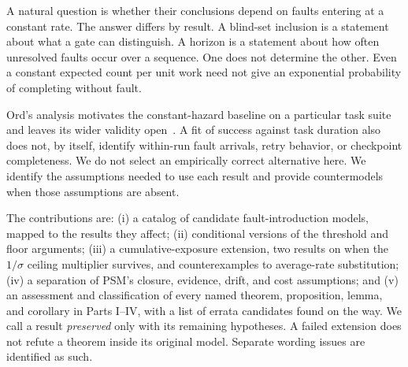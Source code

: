 \documentclass[11pt]{article}
\theoremstyle{definition}
\theoremstyle{remark}
\begin{document}
A natural question is whether their conclusions depend on faults entering at a constant rate.
The answer differs by result. A blind-set inclusion is a statement about what a gate can
distinguish. A horizon is a statement about how often unresolved faults occur over a sequence.
One does not determine the other. Even a constant expected count per unit work need not give
an exponential probability of completing without fault.

Ord's analysis motivates the constant-hazard baseline on a particular task suite and leaves
its wider validity open~\cite{ord}. A fit of success against task duration also does not,
by itself, identify within-run fault arrivals, retry behavior, or checkpoint completeness.
We do not select an empirically correct alternative here. We identify the assumptions needed
to use each result and provide countermodels when those assumptions are absent.

The contributions are: (i) a catalog of candidate fault-introduction models, mapped to the
results they affect; (ii) conditional versions of the threshold and floor arguments;
(iii) a cumulative-exposure extension, two results on when the $1/\sigma$ ceiling multiplier
survives, and counterexamples to average-rate substitution;
(iv) a separation of PSM's closure, evidence, drift, and cost assumptions; and
(v) an assessment and classification of every named theorem, proposition, lemma, and corollary
in Parts I--IV, with a list of errata candidates found on the way.
We call a result \emph{preserved} only with its remaining hypotheses. A failed extension does
not refute a theorem inside its original model. Separate wording issues are identified as such.
\end{document}
